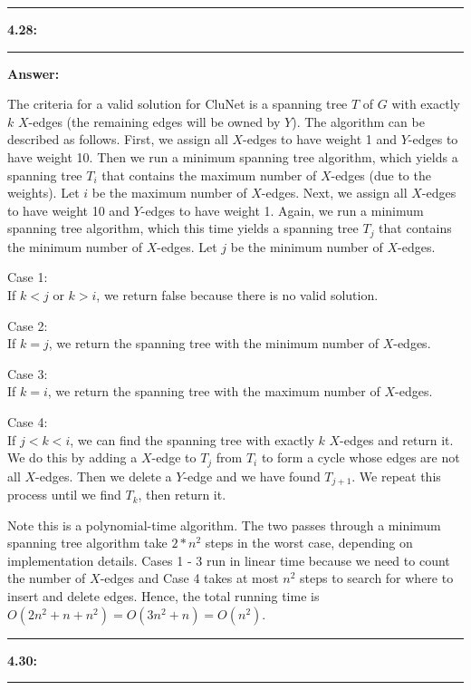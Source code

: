 \documentclass[11pt]{article}
\newcommand\question[2]{\vspace{.25in}\hrule\textbf{#1: #2}\vspace{.5em}\hrule\vspace{.10in}}
\newcommand\answer{\vspace{.10in}\textbf{Answer: }}
\begin{document}
\clearpage

\question{4.28}{}

\answer

The criteria for a valid solution for CluNet is a spanning tree $T$ of $G$ with exactly $k$ $X$-edges (the remaining edges will be owned by $Y$). The algorithm can be described as follows. First, we assign all $X$-edges to have weight 1 and $Y$-edges to have weight 10. Then we run a minimum spanning tree algorithm, which yields a spanning tree $T_i$ that contains the maximum number of $X$-edges (due to the weights). Let $i$ be the maximum number of $X$-edges. Next, we assign all $X$-edges to have weight 10 and $Y$-edges to have weight 1. Again, we run a minimum spanning tree algorithm, which this time yields a spanning tree $T_j$ that contains the minimum number of $X$-edges. Let $j$ be the minimum number of $X$-edges.\newline

Case 1:\\
If $k < j$ or $k > i$, we return false because there is no valid solution.\newline

Case 2:\\
If $k = j$, we return the spanning tree with the minimum number of $X$-edges.\newline

Case 3:\\
If $k = i$, we return the spanning tree with the maximum number of $X$-edges.\newline

Case 4:\\
If $j < k < i$, we can find the spanning tree with exactly $k$ $X$-edges and return it. We do this by adding a $X$-edge to $T_j$ from $T_i$ to form a cycle whose edges are not all $X$-edges. Then we delete a $Y$-edge and we have found $T_{j+1}$. We repeat this process until we find $T_k$, then return it.\newline

Note this is a polynomial-time algorithm. The two passes through a minimum spanning tree algorithm take $2 * n^2$ steps in the worst case, depending on implementation details. Cases 1 - 3 run in linear time because we need to count the number of $X$-edges and Case 4 takes at most $n^2$ steps to search for where to insert and delete edges. Hence, the total running time is $O(2n^2 + n + n^2) = O(3n^2 + n) = O(n^2)$.

\clearpage

\question{4.30}{}
\end{document}
